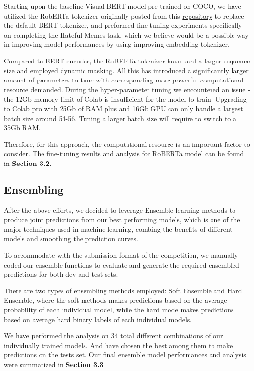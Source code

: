 \documentclass[10pt,twocolumn,letterpaper]{article}
\begin{document}
Starting upon the baseline Visual BERT model pre-trained on COCO, we have utilized the RobERTa tokenizer originally posted from this \href{https://github.com/pytorch/fairseq/tree/master/examples/roberta} {repository} to replace the default BERT tokenizer, and preformed fine-tuning experiments specifically on completing the Hateful Memes task, which we believe would be a possible way in improving model performances by using improving embedding tokenizer.

Compared to BERT encoder, the RoBERTa tokenizer have used a larger sequence size and employed dynamic masking. All this has introduced a significantly larger amount of parameters to tune with corresponding more powerful computational resource demanded. During the hyper-parameter tuning we encountered an issue - the 12Gb memory limit of Colab is insufficient for the model to train. Upgrading to Colab pro with 25Gb of RAM plus and 16Gb GPU can only handle a largest batch size around 54-56. Tuning a larger batch size will require to switch to a 35Gb RAM.

Therefore, for this approach, the computational resource is an important factor to consider. The fine-tuning results and analysis for RoBERTa model can be found in \textbf{Section 3.2}.

\subsection{Ensembling}
After the above efforts, we decided to leverage Ensemble learning methods to produce joint predictions from our best performing models, which is one of the major techniques used in machine learning, combing the benefits of different models and smoothing the prediction curves.

To accommodate with the submission format of the competition, we manually coded our ensemble functions to evaluate and generate the required ensembled predictions for both dev and test sets. 

There are two types of ensembling methods employed:  Soft Ensemble and Hard Ensemble, where the soft methods makes predictions based on the average probability of each individual model, while the hard mode makes predictions based on average hard binary labels of each individual models. 

We have performed the analysis on 34 total different combinations of our individually trained models. And have chosen the best among them to make predictions on the tests set. Our final ensemble model performances and analysis were summarized in \textbf{Section 3.3}
\end{document}

